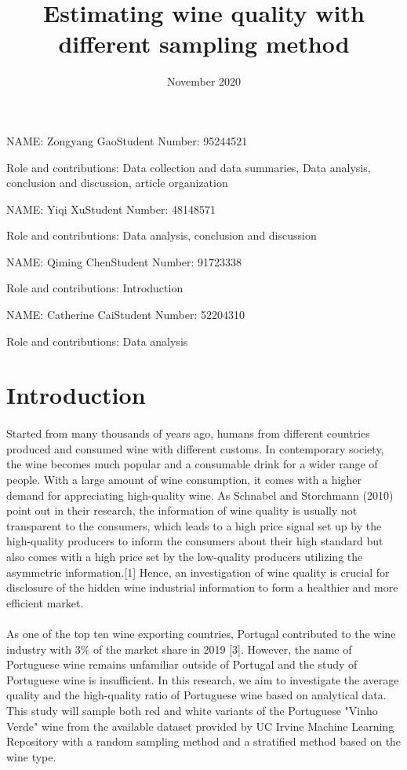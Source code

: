 \documentclass{article}
\title{Estimating wine quality with different sampling method}
\date{November 2020}
\begin{document}
\maketitle
\noindent NAME: Zongyang Gao\hfill Student Number: 95244521\par
Role and contributions: Data collection and data summaries, Data analysis, conclusion and discussion, article organization
\newline 

\noindent NAME: Yiqi Xu\hfill Student Number: 48148571\par
Role and contributions: Data analysis, conclusion and discussion
\newline 

\noindent NAME: Qiming Chen\hfill Student Number: 91723338\par
Role and contributions: Introduction\newline 

\noindent NAME: Catherine Cai\hfill Student Number: 52204310\par
Role and contributions: Data analysis\newline 
\newpage
\section{Introduction}
\paragraph{} 
Started from many thousands of years ago, humans from different countries produced and consumed wine with different customs. In contemporary society, the wine becomes much popular and a consumable drink for a wider range of people. With a large amount of wine consumption, it comes with a higher demand for appreciating high-quality wine. As Schnabel and Storchmann (2010) point out in their research, the information of wine quality is usually not transparent to the consumers, which leads to a high price signal set up by the high-quality producers to inform the consumers about their high standard but also comes with a high price set by the low-quality producers utilizing the asymmetric information.[1] Hence, an investigation of wine quality is crucial for disclosure of the hidden wine industrial information to form a healthier and more efficient market.
\paragraph{}
As one of the top ten wine exporting countries, Portugal contributed to the wine industry with 3\% of the market share in 2019 [3]. However, the name of Portuguese wine remains unfamiliar outside of Portugal and the study of Portuguese wine is insufficient. In this research, we aim to investigate the average quality and the high-quality ratio of Portuguese wine based on analytical data. This study will sample both red and white variants of the Portuguese "Vinho Verde" wine from the available dataset provided by UC Irvine Machine Learning Repository with a random sampling method and a stratified method based on the wine type.
\end{document}
